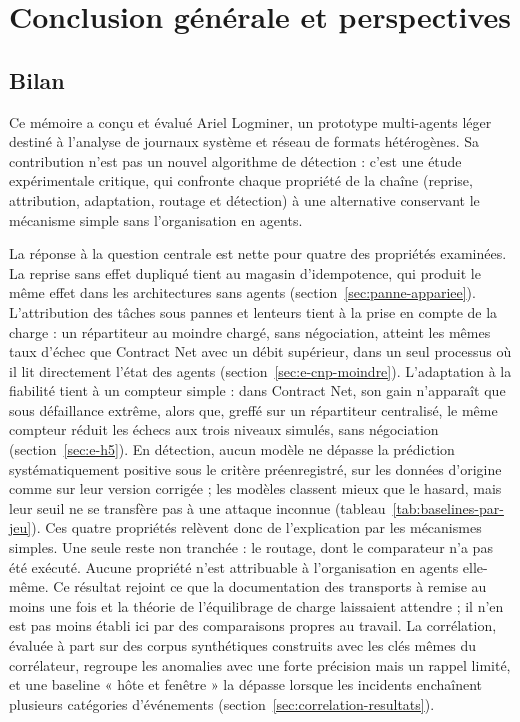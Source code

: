 \chapter*{Conclusion générale et perspectives}


\section*{Bilan}

Ce mémoire a conçu et évalué Ariel Logminer, un prototype multi-agents léger destiné à l'analyse de journaux système et réseau de formats hétérogènes. Sa contribution n'est pas un nouvel algorithme de détection : c'est une étude expérimentale critique, qui confronte chaque propriété de la chaîne (reprise, attribution, adaptation, routage et détection) à une alternative conservant le mécanisme simple sans l'organisation en agents.

La réponse à la question centrale est nette pour quatre des propriétés examinées. La reprise sans effet dupliqué tient au magasin d'idempotence, qui produit le même effet dans les architectures sans agents (section~\ref{sec:panne-appariee}). L'attribution des tâches sous pannes et lenteurs tient à la prise en compte de la charge : un répartiteur au moindre chargé, sans négociation, atteint les mêmes taux d'échec que Contract Net avec un débit supérieur, dans un seul processus où il lit directement l'état des agents (section~\ref{sec:e-cnp-moindre}). L'adaptation à la fiabilité tient à un compteur simple : dans Contract Net, son gain n'apparaît que sous défaillance extrême, alors que, greffé sur un répartiteur centralisé, le même compteur réduit les échecs aux trois niveaux simulés, sans négociation (section~\ref{sec:e-h5}). En détection, aucun modèle ne dépasse la prédiction systématiquement positive sous le critère préenregistré, sur les données d'origine comme sur leur version corrigée ; les modèles classent mieux que le hasard, mais leur seuil ne se transfère pas à une attaque inconnue (tableau~\ref{tab:baselines-par-jeu}). Ces quatre propriétés relèvent donc de l'explication par les mécanismes simples. Une seule reste non tranchée : le routage, dont le comparateur n'a pas été exécuté. Aucune propriété n'est attribuable à l'organisation en agents elle-même. Ce résultat rejoint ce que la documentation des transports à remise au moins une fois et la théorie de l'équilibrage de charge laissaient attendre ; il n'en est pas moins établi ici par des comparaisons propres au travail. La corrélation, évaluée à part sur des corpus synthétiques construits avec les clés mêmes du corrélateur, regroupe les anomalies avec une forte précision mais un rappel limité, et une baseline « hôte et fenêtre » la dépasse lorsque les incidents enchaînent plusieurs catégories d'événements (section~\ref{sec:correlation-resultats}).


